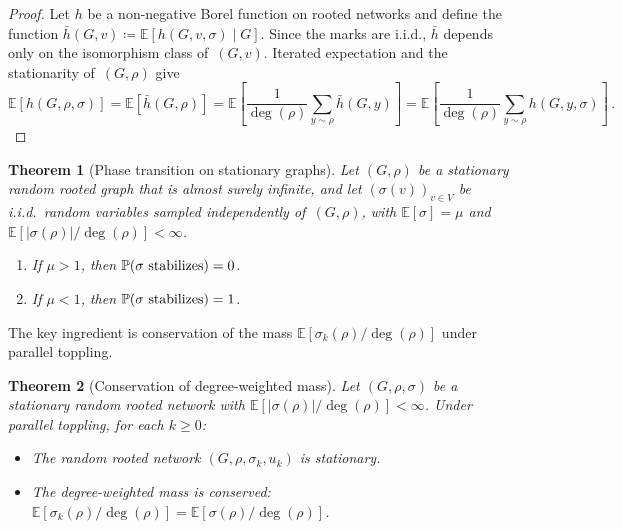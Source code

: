 \documentclass[aop]{imsart}
\theoremstyle{plain}
\newtheorem{theorem}{Theorem}[section]
\theoremstyle{definition}
\newcommand{\E}{\mathbb{E}}
\renewcommand{\P}{\mathbb{P}}
\begin{document}
	\begin{proof}
		Let $h$ be a non-negative Borel function on rooted networks and define the function $\bar{h}(G,v) \coloneqq \E[h(G,v,\sigma) \mid G]$. Since the marks are i.i.d., $\bar{h}$ depends only on the isomorphism class of~$(G,v)$. Iterated expectation and the stationarity of~$(G,\rho)$ give 
		\[
		\E[h(G,\rho,\sigma)]=\E[\bar{h}(G,\rho)]=\E[\frac{1}{\deg(\rho)}\sum_{y\sim\rho}\bar{h}(G,y)]=\E[\frac{1}{\deg(\rho)}\sum_{y\sim\rho}h(G,y,\sigma)]\,.
		\]
	\end{proof}
	
	\begin{theorem}[Phase transition on stationary graphs]\label{thm:stationary-phase}
		Let $(G,\rho)$ be a stationary random rooted graph that is almost surely infinite, and let $(\sigma(v))_{v\in V}$ be i.i.d.\ random variables sampled independently of~$(G,\rho)$, with $\E[\sigma] = \mu$ and $\E[|\sigma(\rho)|/\deg(\rho)] < \infty$.
		\begin{enumerate}[label=\textup{(\roman*)}]
			\item If $\mu > 1$, then $\P(\sigma \textup{ stabilizes}) = 0$.
			\item If $\mu < 1$, then $\P(\sigma \textup{ stabilizes}) = 1$.
		\end{enumerate}
	\end{theorem}
	
	The key ingredient is conservation of the mass $\E[\sigma_k(\rho)/\deg(\rho)]$ under parallel toppling.
	
	\begin{theorem}[Conservation of degree-weighted mass]\label{thm:stationary-toppling}
		Let $(G,\rho,\sigma)$ be a stationary random rooted network with $\E[|\sigma(\rho)|/\deg(\rho)] < \infty$. Under parallel toppling, for each $k \geq 0$:
		\begin{itemize}
			\item[\em (a)] The random rooted network $(G,\rho,\sigma_k,u_k)$ is stationary.
			\item[\em (b)] The degree-weighted mass is conserved: $\E[\sigma_k(\rho)/\deg(\rho)] = \E[\sigma(\rho)/\deg(\rho)]$.
		\end{itemize}
	\end{theorem}
	
\end{document}
